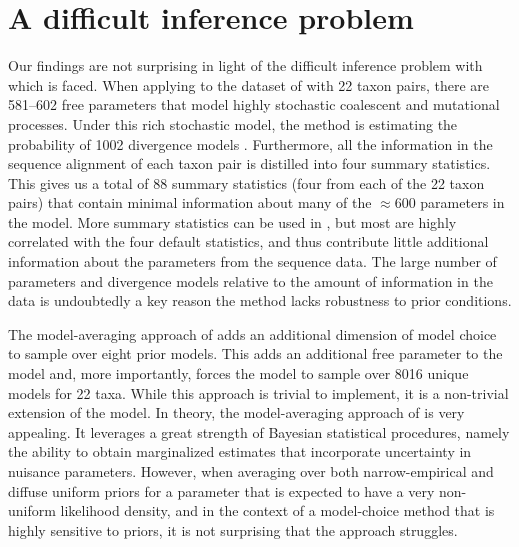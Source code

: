 \section{A difficult inference problem}
Our findings are not surprising in light of the difficult inference problem
with which \msb is faced.
When applying \msb to the dataset of \citet{Oaks2012} with 22 taxon
pairs, there are 581--602 free parameters that model highly stochastic
coalescent and mutational processes.
Under this rich stochastic model, the method is estimating the
probability of 1002 divergence models \citep[i.e., the number of integer
partitions of $Y=22$;][]{Oaks2012}.
Furthermore, all the information in the sequence alignment of each taxon pair
is distilled into four summary statistics.
This gives us a total of 88 summary statistics (four from each of the 22 taxon
pairs) that contain minimal information about many of the $\approx 600$
parameters in the model.
More summary statistics can be used in \msb, but most are highly correlated
with the four default statistics, and thus contribute little additional
information about the parameters from the sequence data.
The large number of parameters and divergence models relative to the amount of
information in the data is undoubtedly a key reason the method lacks robustness
to prior conditions.

The model-averaging approach of \citet{Hickerson2013} adds an additional
dimension of model choice to sample over eight prior models.
This adds an additional free parameter to the model and, more importantly,
forces the model to sample over 8016 unique models for 22 taxa.
While this approach is trivial to implement, it is a non-trivial extension of
the model.
In theory, the model-averaging approach of \citet{Hickerson2013} is very
appealing.
It leverages a great strength of Bayesian statistical procedures, namely the
ability to obtain marginalized estimates that incorporate uncertainty in
nuisance parameters.
However, when averaging over both narrow-empirical and diffuse uniform priors
for a parameter that is expected to have a very non-uniform likelihood density,
and in the context of a model-choice method that is highly sensitive to priors,
it is not surprising that the approach struggles.

